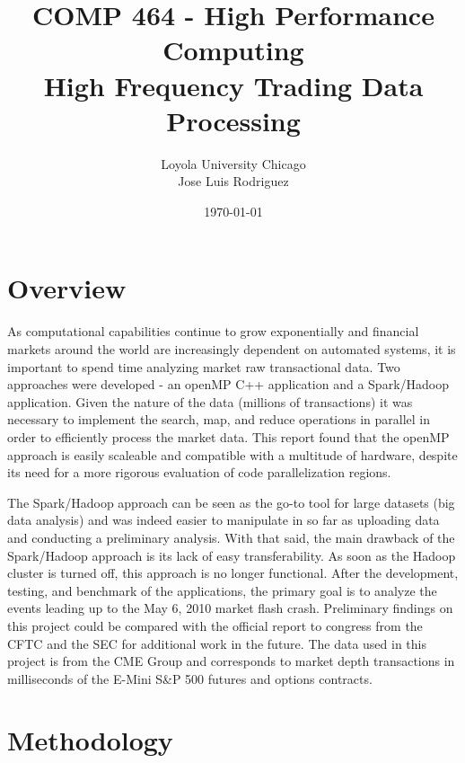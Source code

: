 \documentclass[12pt]{article} %
\title{COMP 464 - High Performance Computing \\ High Frequency Trading Data Processing} %
\author{
Loyola University Chicago \\
Jose Luis Rodriguez 
} %
\date{\today} %
\begin{document}
\maketitle

\thispagestyle{fancy}


\section{Overview}

As computational capabilities continue to grow exponentially and financial markets around the world are increasingly dependent on automated systems, it is important to spend time analyzing market raw transactional data. Two approaches were developed - an openMP C++ application and a Spark/Hadoop application. Given the nature of the data (millions of transactions) it was necessary to implement the search, map, and reduce operations in parallel in order to efficiently process the market data. This report found that the openMP approach is easily scaleable and compatible with a multitude of hardware, despite its need for a more rigorous evaluation of code parallelization regions. 

The Spark/Hadoop approach can be seen as the go-to tool for large datasets (big data analysis) and was indeed easier to manipulate in so far as uploading data and conducting a preliminary analysis. With that said, the main drawback of the Spark/Hadoop approach is its lack of easy transferability. As soon as the Hadoop cluster is turned off, this approach is no longer functional. After the development, testing, and benchmark of the applications, the primary goal is to analyze the events leading up to the May 6, 2010 market flash crash. Preliminary findings on this project could be compared with the official report to congress from the CFTC and the SEC for additional work in the future. The data used in this project is from the CME Group and corresponds to market depth transactions in milliseconds of the E-Mini S\&P 500 futures and options contracts. 



\section{Methodology}
\end{document}
